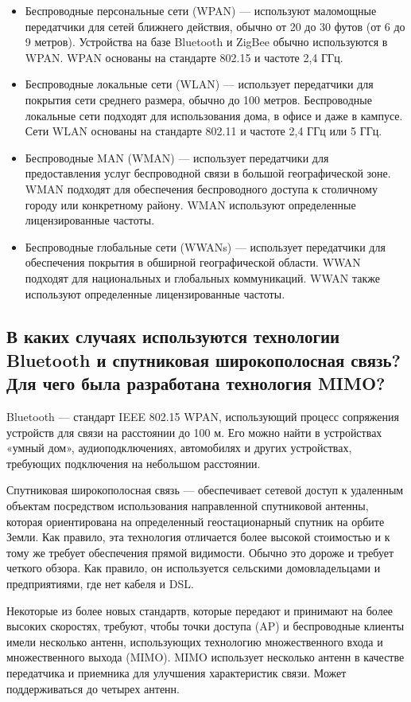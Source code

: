 \begin{itemize}
	\item Беспроводные персональные сети (WPAN) --- используют 
		маломощные передатчики для сетей ближнего действия, обычно от 20 
		до 30 футов (от 6 до 9 метров). Устройства на базе Bluetooth и ZigBee 
		обычно используются в WPAN. WPAN основаны на стандарте 802.15 
		и частоте 2,4 ГГц.
	\item Беспроводные локальные сети (WLAN) --- использует 
		передатчики для покрытия сети среднего размера, обычно до 100 
		метров. Беспроводные локальные сети подходят для использования 
		дома, в офисе и даже в кампусе. Сети WLAN основаны на стандарте 
		802.11 и частоте 2,4 ГГц или 5 ГГц.
	\item Беспроводные MAN (WMAN) --- использует передатчики для 
		предоставления услуг беспроводной связи в большой географической 
		зоне. WMAN подходят для обеспечения беспроводного доступа к 
		столичному городу или конкретному району. WMAN используют 
		определенные лицензированные частоты.
	\item Беспроводные глобальные сети (WWANs) --- использует 
		передатчики для обеспечения покрытия в обширной географической 
		области. WWAN подходят для национальных и глобальных 
		коммуникаций. WWAN также используют определенные 
		лицензированные частоты.
\end{itemize}

\subsection{В каких случаях используются технологии Bluetooth и 
спутниковая широкополосная связь? Для чего была 
разработана технология MIMO?}

Bluetooth --- стандарт IEEE 802.15 WPAN, использующий процесс 
сопряжения устройств для связи на расстоянии до 100 м. Его можно найти в 
устройствах «умный дом», аудиоподключениях, автомобилях и других 
устройствах, требующих подключения на небольшом расстоянии.\par
Спутниковая широкополосная связь --- обеспечивает сетевой доступ 
к удаленным объектам посредством использования направленной 
спутниковой антенны, которая ориентирована на определенный 
геостационарный спутник на орбите Земли. Как правило, эта технология 
отличается более высокой стоимостью и к тому же требует обеспечения 
прямой видимости. Обычно это дороже и требует четкого обзора. Как 
правило, он используется сельскими домовладельцами и предприятиями, где 
нет кабеля и DSL.\par
Некоторые из более новых стандартв, которые передают и принимают 
на более высоких скоростях, требуют, чтобы точки доступа (AP) и 
беспроводные клиенты имели несколько антенн, использующих технологию 
множественного входа и множественного выхода (MIMO). MIMO 
использует несколько антенн в качестве передатчика и приемника для 
улучшения характеристик связи. Может поддерживаться до четырех антенн.

